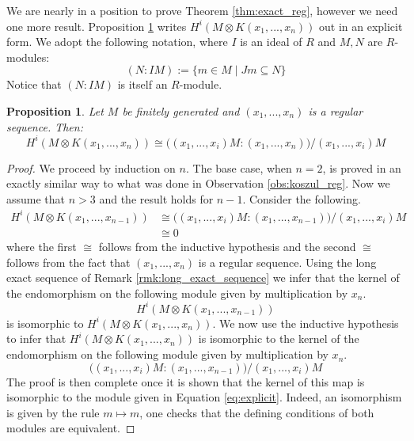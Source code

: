 \documentclass[12pt]{article}
\theoremstyle{plain}
\newtheorem{proposition}[thm]{Proposition}
\theoremstyle{definition}
\begin{document}
	We are nearly in a position to prove Theorem \ref{thm:exact_reg}, however we need one more result. Proposition \ref{prop:kozology_explicit} writes $H^i(M \otimes K(x_1,...,x_n))$ out in an explicit form. We adopt the following notation, where $I$ is an ideal of $R$ and $M,N$ are $R$-modules:
	\begin{equation}
		(N:IM) := \lbrace m \in M \mid Jm \subseteq N\rbrace
	\end{equation}
	Notice that $(N:IM)$ is itself an $R$-module.
	\begin{proposition}\label{prop:kozology_explicit}
		Let $M$ be finitely generated and $(x_1,...,x_n)$ is a regular sequence. Then:
		\begin{equation}\label{eq:explicit}
			H^i(M \otimes K(x_1,...,x_n)) \cong \big((x_1,...,x_i)M:(x_1,...,x_n)\big)/(x_1,...,x_i)M
		\end{equation}
	\end{proposition}
	\begin{proof}
		We proceed by induction on $n$. The base case, when $n = 2$, is proved in an exactly similar way to what was done in Observation \ref{obs:koszul_reg}. Now we assume that $n > 3$ and the result holds for $n-1$. Consider the following.
		\begin{align*}
			H^i(M \otimes K(x_1,...,x_{n-1})) &\cong \big((x_1,...,x_i)M:(x_1,...,x_{n-1})\big)/(x_1,...,x_i)M\\
			&\cong 0
		\end{align*}
		where the first $\cong$ follows from the inductive hypothesis and the second $\cong$ follows from the fact that $(x_1,...,x_n)$ is a regular sequence. Using the long exact sequence of Remark \ref{rmk:long_exact_sequence} we infer that the kernel of the endomorphism on the following module given by multiplication by $x_n$.
		\begin{equation}
			H^{i}(M \otimes K(x_1,...,x_{n-1}))
		\end{equation}
		is isomorphic to $H^{i}(M \otimes K(x_1,...,x_n))$. We now use the inductive hypothesis to infer that $H^i(M \otimes K(x_1,...,x_n))$ is isomorphic to the kernel of the endomorphism on the following module given by multiplication by $x_n$.
		\begin{equation}
			\big((x_1,...,x_i)M:(x_1,...,x_{n-1})\big)/(x_1,...,x_i)M
		\end{equation}
		The proof is then complete once it is shown that the kernel of this map is isomorphic to the module given in Equation \ref{eq:explicit}. Indeed, an isomorphism is given by the rule $m \longmapsto m$, one checks that the defining conditions of both modules are equivalent.
	\end{proof}
\end{document}
